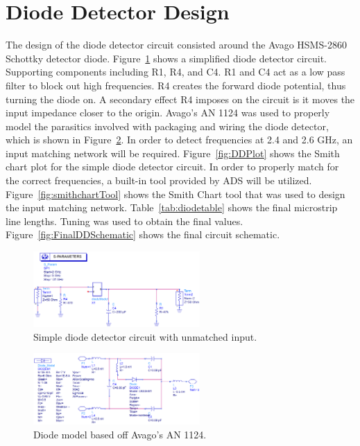 \documentclass[conference]{IEEEtran}
\begin{document}
\section{Diode Detector Design}
The design of the diode detector circuit consisted around the Avago HSMS-2860 Schottky detector diode.  Figure~\ref{fig:DDSchematic} shows a simplified diode detector circuit.  Supporting components including R1, R4, and C4.  R1 and C4 act as a low pass filter to block out high frequencies.  R4 creates the forward diode potential, thus turning the diode on.  A secondary effect R4 imposes on the circuit is it moves the input impedance closer to the origin.  Avago's AN 1124\cite{an1124} was used to properly model the parasitics involved with packaging and wiring the diode detector, which is shown in Figure~\ref{fig:diodeModel}.  In order to detect frequencies at 2.4 and 2.6 GHz, an input matching network will be required.  Figure~\ref{fig:DDPlot} shows the Smith chart plot for the simple diode detector circuit.  In order to properly match for the correct frequencies, a built-in tool provided by ADS will be utilized.  Figure~\ref{fig:smithchartTool} shows the Smith Chart tool that was used to design the input matching network.  Table~\ref{tab:diodetable} shows the final microstrip line lengths.  Tuning was used to obtain the final values.  Figure~\ref{fig:FinalDDSchematic} shows the final circuit schematic.  

\begin{figure}[!htb]
\centering
\includegraphics[width=2.5in]{diode-pics/diodedetectorSimplifiedSchematic.png}
\caption{Simple diode detector circuit with unmatched input.}
\label{fig:DDSchematic}
\end{figure}

\begin{figure}[!htb]
\centering
\includegraphics[width=2.5in]{diode-pics/diodedetectormodel.png}
\caption{Diode model based off Avago's AN 1124.}
\label{fig:diodeModel}
\end{figure}
\end{document}
